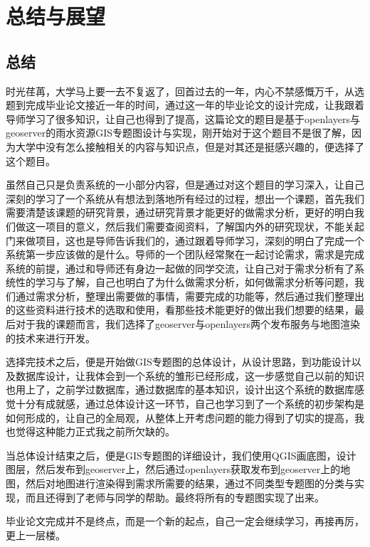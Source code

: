 
\chapter{总结与展望}



\section{总结}
时光荏苒，大学马上要一去不复返了，回首过去的一年，内心不禁感慨万千，从选题到完成毕业论文接近一年的时间，通过这一年的毕业论文的设计完成，让我跟着导师学习了很多知识，让自己也得到了提高，这篇论文的题目是基于openlayers与geoserver的雨水资源GIS专题图设计与实现，刚开始对于这个题目不是很了解，因为大学中没有怎么接触相关的内容与知识点，但是对其还是挺感兴趣的，便选择了这个题目。

虽然自己只是负责系统的一小部分内容，但是通过对这个题目的学习深入，让自己深刻的学习了一个系统从有想法到落地所有经过的过程，想出一个课题，首先我们需要清楚该课题的研究背景，通过研究背景才能更好的做需求分析，更好的明白我们做这一项目的意义，然后我们需要查阅资料，了解国内外的研究现状，不能关起门来做项目，这也是导师告诉我们的，通过跟着导师学习，深刻的明白了完成一个系统第一步应该做的是什么。导师的一个团队经常聚在一起讨论需求，需求是完成系统的前提，通过和导师还有身边一起做的同学交流，让自己对于需求分析有了系统性的学习与了解，自己也明白了为什么做需求分析，如何做需求分析等问题，我们通过需求分析，整理出需要做的事情，需要完成的功能等，然后通过我们整理出的这些资料进行技术的选取和使用，看那些技术能更好的做出我们想要的结果，最后对于我的课题而言，我们选择了geoserver与openlayers两个发布服务与地图渲染的技术来进行开发。

选择完技术之后，便是开始做GIS专题图的总体设计，从设计思路，到功能设计以及数据库设计，让我体会到一个系统的雏形已经形成，这一步感觉自己以前的知识也用上了，之前学过数据库，通过数据库的基本知识，设计出这个系统的数据库感觉十分有成就感，通过总体设计这一环节，自己也学习到了一个系统的初步架构是如何形成的，让自己的全局观，从整体上开考虑问题的能力得到了切实的提高，我也觉得这种能力正式我之前所欠缺的。

当总体设计结束之后，便是GIS专题图的详细设计，我们使用QGIS画底图，设计图层，然后发布到geoserver上，然后通过openlayers获取发布到geoserver上的地图，然后对地图进行渲染得到需求所需要的结果，通过不同类型专题图的分类与实现，而且还得到了老师与同学的帮助。最终将所有的专题图实现了出来。

毕业论文完成并不是终点，而是一个新的起点，自己一定会继续学习，再接再厉，更上一层楼。

